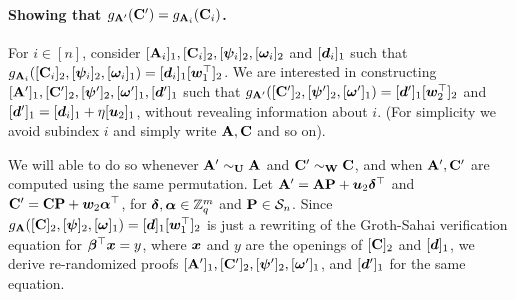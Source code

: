 
\paragraph{Showing that $g_{\mathbf{{A}}'}(\mathbf{{C}}')=g_{\mathbf{{A}}_i}(\mathbf{{C}}_i)$.}
For $i\in[n]$, consider $[\mathbf{{A}}_i]_1,[\mathbf{{C}}_i]_2,[{\boldsymbol{\psi}}_i]_2,[{\boldsymbol{\omega}}_i]_2$ and $[{\boldsymbol{d}}_i]_1$ such that $g_{\mathbf{{A}}_i}([\mathbf{{C}}_i]_2,\allowbreak[{\boldsymbol{\psi}}_i]_2,[{\boldsymbol{\omega}}_i]_1)=[{\boldsymbol{d}}_i]_1[{\boldsymbol{w}}_1^\top]_2$. We are interested in constructing
 $[\mathbf{{A}}']_1,[\mathbf{{C}}']_2,\allowbreak[{\boldsymbol{\psi}}']_2,[{\boldsymbol{\omega}}']_1,[{\boldsymbol{d}}']_1$ such that $g_{\mathbf{{A}}'}([\mathbf{{C}}']_2,[{\boldsymbol{\psi}}']_2,[{\boldsymbol{\omega}}']_1) = [{\boldsymbol{d}}']_1[{\boldsymbol{w}}_2^\top]_2$
 and $[{\boldsymbol{d}}']_1=[{\boldsymbol{d}}_i]_1 + \eta[{\boldsymbol{u}}_2]_1$, without revealing information about $i$. (For simplicity we avoid subindex $i$ and simply write $\mathbf{{A}},\mathbf{{C}}$ and so on).


We will able to do so whenever $\mathbf{{A}}'\sim_{\mathbf{{U}}}\mathbf{{A}}$ and $\mathbf{{C}}'\sim_{\mathbf{{W}}}\mathbf{{C}}$, and when $\mathbf{{A}}',\mathbf{{C}}'$ are computed using the same permutation.
Let $\mathbf{{A}}' = \mathbf{{A}}\mathbf{{P}}+{\boldsymbol{u}}_2{\boldsymbol{\delta}}^\top$ and $\mathbf{{C}}' = \mathbf{{C}}\mathbf{{P}}+{\boldsymbol{w}}_2{\boldsymbol{\alpha}}^\top$, for ${\boldsymbol{\delta}},{\boldsymbol{\alpha}}\in\mathbb{Z}_q^m$ and $\mathbf{{P}}\in\mathcal{S}_n$.
 Since $g_{\mathbf{{A}}}([\mathbf{{C}}]_2,[{\boldsymbol{\psi}}]_2,[{\boldsymbol{\omega}}]_1)=[{\boldsymbol{d}}]_1[{\boldsymbol{w}}_1^\top]_2$ is just a rewriting of the Groth-Sahai verification equation for ${\boldsymbol{\beta}}^\top{\boldsymbol{x}} = y$, where ${\boldsymbol{x}}$ and $y$ are the openings of $[\mathbf{{C}}]_2$ and $[{\boldsymbol{d}}]_1$, we derive re-randomized proofs $[\mathbf{{A}}']_1,[\mathbf{{C}}']_2,[{\boldsymbol{\psi}}']_2,[{\boldsymbol{\omega}}']_1$, and $[{\boldsymbol{d}}']_1$ for the same equation.
 
